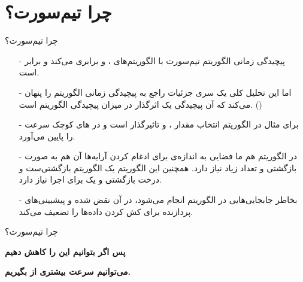 \section{چرا تیم‌سورت؟}
\begin{frame}{چرا تیم‌سورت؟}
\begin{itemize}\itemr
\item[-]
پیچیدگی زمانی الگوریتم تیم‌سورت با الگوریتم‌های 
،
 و
برابری می‌کند و برابر 
است.

\item[-]
اما این تحلیل کلی یک سری جزئیات راجع به پیچیدگی زمانی الگوریتم را پنهان می‌کند که آن پیچیدگی یک 
اثرگذار در میزان پیچیدگی الگوریتم است. ()

\item[-]
برای مثال در الگوریتم  انتخاب مقدار 
،
 و
تاثیرگذار است و در های کوچک سرعت را پایین می‌آورد.

\item[-]
در الگوریتم 
هم ما فضایی به اندازه‌ی  برای ادغام کردن آرایه‌ها آن هم به صورت بازگشتی و تعداد زیاد نیاز دارد. همچنین این الگوریتم یک الگوریتم بازگشتی‌ست و درخت بازگشتی و یک  برای اجرا نیاز دارد.

\item[-]
بخاطر جابجایی‌هایی در الگوریتم  انجام می‌شود، 
در آن نقض شده و پیشبینی‌های پردازنده‌ برای کش کردن داده‌ها را تضعیف می‌کند.
\end{itemize}
\end{frame}

\begin{frame}{چرا تیم‌سورت؟}
\begin{center}
{\Large \textbf{پس اگر بتوانیم این  را کاهش دهیم}}

{\Large \textbf{می‌توانیم سرعت بیشتری از  بگیریم.}}
\end{center}
\end{frame}
